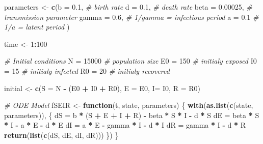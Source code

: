 \documentclass[]{book}
\newenvironment{Shaded}{\begin{snugshade}}{\end{snugshade}}
\newcommand{\KeywordTok}[1]{\textcolor[rgb]{0.13,0.29,0.53}{\textbf{#1}}}
\newcommand{\DataTypeTok}[1]{\textcolor[rgb]{0.13,0.29,0.53}{#1}}
\newcommand{\DecValTok}[1]{\textcolor[rgb]{0.00,0.00,0.81}{#1}}
\newcommand{\FloatTok}[1]{\textcolor[rgb]{0.00,0.00,0.81}{#1}}
\newcommand{\StringTok}[1]{\textcolor[rgb]{0.31,0.60,0.02}{#1}}
\newcommand{\CommentTok}[1]{\textcolor[rgb]{0.56,0.35,0.01}{\textit{#1}}}
\newcommand{\ControlFlowTok}[1]{\textcolor[rgb]{0.13,0.29,0.53}{\textbf{#1}}}
\newcommand{\OperatorTok}[1]{\textcolor[rgb]{0.81,0.36,0.00}{\textbf{#1}}}
\newcommand{\NormalTok}[1]{#1}
\theoremstyle{definition}
\theoremstyle{definition}
\theoremstyle{definition}
\theoremstyle{remark}
\begin{document}
\begin{Shaded}
\begin{Highlighting}[]
\NormalTok{parameters <-}\StringTok{ }\KeywordTok{c}\NormalTok{(}\DataTypeTok{b     =} \FloatTok{0.1}\NormalTok{,        }\CommentTok{# birth rate}
                \DataTypeTok{d     =} \FloatTok{0.1}\NormalTok{,        }\CommentTok{# death rate}
                \DataTypeTok{beta  =} \FloatTok{0.00025}\NormalTok{,    }\CommentTok{# transmission parameter}
                \DataTypeTok{gamma =} \FloatTok{0.6}\NormalTok{,        }\CommentTok{# 1/gamma = infectious period}
                \DataTypeTok{a     =} \FloatTok{0.1}        \CommentTok{# 1/a = latent period}
\NormalTok{                )}

\NormalTok{time <-}\StringTok{ }\DecValTok{1}\OperatorTok{:}\DecValTok{100}

\CommentTok{# Initial conditions}
\NormalTok{N =}\StringTok{ }\DecValTok{15000}    \CommentTok{# population size}
\NormalTok{E0 =}\StringTok{ }\DecValTok{150}     \CommentTok{# initialy exposed}
\NormalTok{I0 =}\StringTok{ }\DecValTok{15}      \CommentTok{# initialy infected}
\NormalTok{R0 =}\StringTok{ }\DecValTok{20}      \CommentTok{# initialy recovered}

\NormalTok{initial <-}\StringTok{ }\KeywordTok{c}\NormalTok{(}\DataTypeTok{S =}\NormalTok{ N }\OperatorTok{-}\StringTok{ }\NormalTok{(E0 }\OperatorTok{+}\StringTok{ }\NormalTok{I0 }\OperatorTok{+}\StringTok{ }\NormalTok{R0), }\DataTypeTok{E =}\NormalTok{ E0, }\DataTypeTok{I=}\NormalTok{ I0, }\DataTypeTok{R =}\NormalTok{ R0)}

\CommentTok{# ODE Model}
\NormalTok{fSEIR <-}\StringTok{ }\ControlFlowTok{function}\NormalTok{(t, state, parameters) \{}
  \KeywordTok{with}\NormalTok{(}\KeywordTok{as.list}\NormalTok{(}\KeywordTok{c}\NormalTok{(state, parameters)), \{}
\NormalTok{    dS =}\StringTok{ }\NormalTok{b }\OperatorTok{*}\StringTok{ }\NormalTok{(S }\OperatorTok{+}\StringTok{ }\NormalTok{E }\OperatorTok{+}\StringTok{ }\NormalTok{I }\OperatorTok{+}\StringTok{ }\NormalTok{R) }\OperatorTok{-}\StringTok{ }\NormalTok{beta }\OperatorTok{*}\StringTok{ }\NormalTok{S }\OperatorTok{*}\StringTok{ }\NormalTok{I }\OperatorTok{-}\StringTok{ }\NormalTok{d }\OperatorTok{*}\StringTok{ }\NormalTok{S}
\NormalTok{    dE =}\StringTok{ }\NormalTok{beta }\OperatorTok{*}\StringTok{ }\NormalTok{S }\OperatorTok{*}\StringTok{ }\NormalTok{I }\OperatorTok{-}\StringTok{ }\NormalTok{a }\OperatorTok{*}\StringTok{ }\NormalTok{E }\OperatorTok{-}\StringTok{ }\NormalTok{d }\OperatorTok{*}\StringTok{ }\NormalTok{E}
\NormalTok{    dI =}\StringTok{ }\NormalTok{a }\OperatorTok{*}\StringTok{ }\NormalTok{E }\OperatorTok{-}\StringTok{ }\NormalTok{gamma }\OperatorTok{*}\StringTok{ }\NormalTok{I }\OperatorTok{-}\StringTok{ }\NormalTok{d }\OperatorTok{*}\StringTok{ }\NormalTok{I}
\NormalTok{    dR =}\StringTok{ }\NormalTok{gamma }\OperatorTok{*}\StringTok{ }\NormalTok{I }\OperatorTok{-}\StringTok{ }\NormalTok{d }\OperatorTok{*}\StringTok{ }\NormalTok{R}
    \KeywordTok{return}\NormalTok{(}\KeywordTok{list}\NormalTok{(}\KeywordTok{c}\NormalTok{(dS, dE, dI, dR)))}
\NormalTok{  \})}
\NormalTok{\}}


\end{Highlighting}
\end{Shaded}
\end{document}
